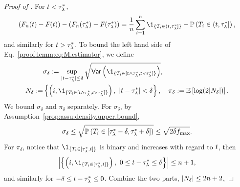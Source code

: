 \begin{proof}[Proof of ]
For ${t} < {\tau^*_\lambda}$,
    \begin{align*}
        \left(\EmpiricalCdfTestStatistics(\threshold) - \cdfTestStatistics{}(\threshold)\right) -
        \left(\EmpiricalCdfTestStatistics(\trueThreshold) - \cdfTestStatistics{}(\trueThreshold)\right)
        = \frac{1}{n} \sum_{i=1}^\No \1_{\{\testStatistics{i} \in (\threshold, \trueThreshold]\}} - \PP\left(\testStatistics{i} \in (\threshold, \trueThreshold]\right),
    \end{align*}
    and similarly for ${t} > {\tau^*_\lambda}$. To bound the left hand side of Eq.~\eqref{proof:lemm:eq:M.estimator}, we define   \begin{align*}
        &\sigma_\delta
        := \sup_{|\threshold - \trueThreshold| \le \delta} \sqrt{\var\left(\1_{\{\testStatistics{i} \in [\threshold \wedge \trueThreshold, \threshold \vee \trueThreshold]\}}\right)},\\
        N_\delta :=& \left\{\left(i, \1_{\{\testStatistics{i} \in [\threshold \wedge \trueThreshold, \threshold \vee \trueThreshold]\}}\right), ~|\threshold - \trueThreshold| < \delta \right\}, \quad
        \pi_\delta
        := \EE \left[\log(2 |N_\delta|)\right].
    \end{align*}
    We bound $\sigma_\delta$ and $ \pi_\delta $ separately. For $\sigma_\delta$, by Assumption~\ref{prop:assu:density.upper.bound},
    \begin{align}\label{proof:lemm:eq:bound.sigma}
        \sigma_\delta
        \le \sqrt{\mathbb{P}\left({T_{i}} \in [{\tau^*_\lambda} - \delta, {\tau^*_\lambda} + \delta]\right)}
        \le \sqrt{2 \delta {f_{\max}}}.
    \end{align}
    For $\pi_\delta$, notice that $\1_{\{\testStatistics{i} \in [\trueThreshold, \threshold]\}}$ is binary and increases with regard to ${t}$, then
    \begin{align*}
         \left|\left\{\left(i, \1_{\{\testStatistics{i} \in [\trueThreshold, \threshold]\}}\right), ~0 \le \threshold - \trueThreshold \le \delta \right\}\right| \le \No+1,
    \end{align*}
    and similarly for $-\delta \le {t} - {\tau^*_\lambda} \le 0$. Combine the two parts, $ \left|N_\delta\right| \le 2 {n}+2$,

\end{proof}
